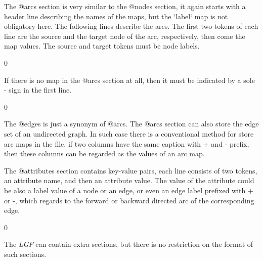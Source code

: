 The {\ttfamily @arcs} section is very similar to the {\ttfamily @nodes} section, it again starts with a header line describing the names of the maps, but the {\ttfamily \char`\"{}label\char`\"{}} map is not obligatory here. The following lines describe the arcs. The first two tokens of each line are the source and the target node of the arc, respectively, then come the map values. The source and target tokens must be node labels.


\begin{DoxyCode}{0}

\end{DoxyCode}


If there is no map in the {\ttfamily @arcs} section at all, then it must be indicated by a sole \textquotesingle{}-\/\textquotesingle{} sign in the first line.


\begin{DoxyCode}{0}
\DoxyCodeLine{        -\/}

\end{DoxyCode}


The {\ttfamily @edges} is just a synonym of {\ttfamily @arcs}. The @arcs section can also store the edge set of an undirected graph. In such case there is a conventional method for store arc maps in the file, if two columns have the same caption with {\ttfamily \textquotesingle{}+\textquotesingle{}} and {\ttfamily \textquotesingle{}-\/\textquotesingle{}} prefix, then these columns can be regarded as the values of an arc map.

The {\ttfamily @attributes} section contains key-\/value pairs, each line consists of two tokens, an attribute name, and then an attribute value. The value of the attribute could be also a label value of a node or an edge, or even an edge label prefixed with {\ttfamily \textquotesingle{}+\textquotesingle{}} or {\ttfamily \textquotesingle{}-\/\textquotesingle{}}, which regards to the forward or backward directed arc of the corresponding edge.


\begin{DoxyCode}{0}

\end{DoxyCode}


The {\itshape LGF} can contain extra sections, but there is no restriction on the format of such sections. 